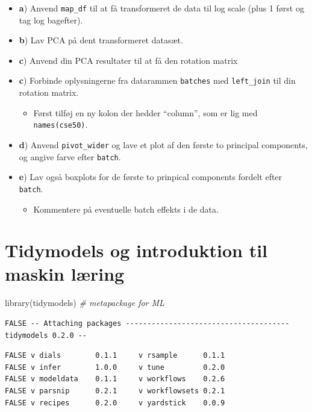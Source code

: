 \documentclass[
]{book}
\newenvironment{Shaded}{\begin{snugshade}}{\end{snugshade}}
\newcommand{\CommentTok}[1]{\textcolor[rgb]{0.56,0.35,0.01}{\textit{#1}}}
\newcommand{\FunctionTok}[1]{\textcolor[rgb]{0.00,0.00,0.00}{#1}}
\newcommand{\NormalTok}[1]{#1}
\providecommand{\tightlist}{%
  \setlength{\itemsep}{0pt}\setlength{\parskip}{0pt}}
\begin{document}
\begin{itemize}
\item
  \textbf{a}) Anvend \texttt{map\_df} til at få transformeret de data til log scale (plus 1 først og tag log bagefter).
\item
  \textbf{b}) Lav PCA på dent transformeret datasæt.
\item
  \textbf{c}) Anvend din PCA resultater til at få den rotation matrix
\item
  \textbf{c}) Forbinde oplysningerne fra datarammen \texttt{batches} med \texttt{left\_join} til din rotation matrix.

  \begin{itemize}
  \tightlist
  \item
    Først tilføj en ny kolon der hedder ``column'', som er lig med \texttt{names(cse50)}.
  \end{itemize}
\item
  \textbf{d}) Anvend \texttt{pivot\_wider} og lave et plot af den første to principal components, og angive farve efter \texttt{batch}.
\item
  \textbf{e}) Lav også boxplots for de første to prinpical components fordelt efter \texttt{batch}.

  \begin{itemize}
  \tightlist
  \item
    Kommentere på eventuelle batch effekts i de data.
  \end{itemize}
\end{itemize}

\hypertarget{tidymodels-og-introduktion-til-maskin-luxe6ring}{%
\chapter{Tidymodels og introduktion til maskin læring}\label{tidymodels-og-introduktion-til-maskin-luxe6ring}}

\begin{Shaded}
\begin{Highlighting}[]
\FunctionTok{library}\NormalTok{(tidymodels) }\CommentTok{\# metapackage for ML }
\end{Highlighting}
\end{Shaded}

\begin{verbatim}
FALSE -- Attaching packages -------------------------------------- tidymodels 0.2.0 --
\end{verbatim}

\begin{verbatim}
FALSE v dials        0.1.1     v rsample      0.1.1
FALSE v infer        1.0.0     v tune         0.2.0
FALSE v modeldata    0.1.1     v workflows    0.2.6
FALSE v parsnip      0.2.1     v workflowsets 0.2.1
FALSE v recipes      0.2.0     v yardstick    0.0.9
\end{verbatim}
\end{document}
